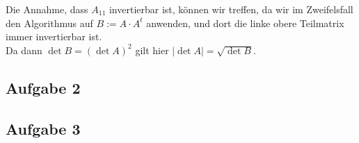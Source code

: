\documentclass[11pt,a4paper,ngerman]{article}
\begin{document}
Die Annahme, dass $A_{11}$ invertierbar ist, können wir treffen, da wir im Zweifelsfall den Algorithmus
auf $B := A\cdot A^{t}$ anwenden, und dort die linke obere Teilmatrix immer invertierbar ist. \\
Da dann $\det B = (\det A)^2$ gilt hier $|\det A| = \sqrt{\det B}$.


\subsection*{Aufgabe 2}

\subsection*{Aufgabe 3}



\label{LastPage}
\end{document}
